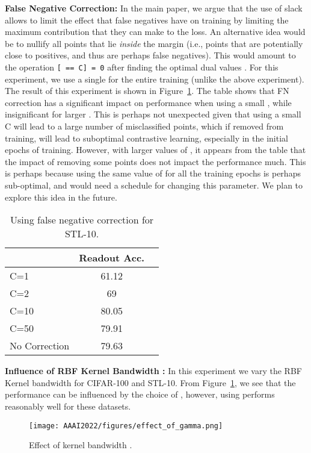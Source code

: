 \documentclass[letterpaper]{article} \usepackage{aaai22}  \usepackage{times}  \usepackage{helvet}  \usepackage{courier}  \usepackage[hyphens]{url}  \usepackage{graphicx} \urlstyle{rm} \def\UrlFont{\rm}  \usepackage{natbib}  \usepackage{caption} \DeclareCaptionStyle{ruled}{labelfont=normalfont,labelsep=colon,strut=off} \frenchspacing  \setlength{\pdfpagewidth}{8.5in}  \setlength{\pdfpageheight}{11in}
\begin{document}
\noindent\textbf{False Negative Correction:}
In the main paper, we argue that the use of slack allows to limit the effect that false negatives have on training by limiting the maximum contribution that they can make to the loss. An alternative idea would be to nullify all points that lie \emph{inside} the margin (i.e., points that are potentially close to positives, and thus are perhaps false negatives). This would amount to the operation \texttt{[ == C] = 0} after finding the optimal dual values . For this experiment, we use a single  for the entire training (unlike the above experiment). The result of this experiment is shown in Figure~\ref{tab: C_FN_correction}. The table shows that FN correction has a significant impact on performance when using a small , while insignificant for larger . This is perhaps not unexpected given that using a small C will lead to a large number of misclassified points, which if removed from training, will lead to suboptimal contrastive learning, especially in the initial epochs of training. However, with larger values of , it appears from the table that the impact of removing some points does not impact the performance much. This is perhaps because using the same value of  for all the training epochs is perhaps sub-optimal, and would need a schedule for changing this parameter. We plan to explore this idea in the future.

\begin{table}[]
    \centering
    \begin{tabular}{lcr}
    \toprule
      & Readout Acc. \\
    \midrule
    C=1  & 61.12  \\
    C=2 & 69   \\
    C=10  & 80.05  \\
    C=50  & 79.91    \\
    No Correction  & 79.63   \\
    \bottomrule
    \end{tabular}
     \caption{Using false negative correction for STL-10.}
    \label{tab: C_FN_correction}
\end{table}

\noindent\textbf{Influence of RBF Kernel Bandwidth :}
In this experiment we vary the RBF Kernel bandwidth for CIFAR-100 and STL-10. From Figure~\ref{fig: main_gamma_ablation},  we see that the performance can be influenced by the choice of , however, using  performs reasonably well for these datasets. 

\begin{figure}
        \centering
        \texttt{[image: AAAI2022/figures/effect\_of\_gamma.png]} \caption{Effect of kernel bandwidth .}
        \label{fig: main_gamma_ablation}
\end{figure}
\end{document}
